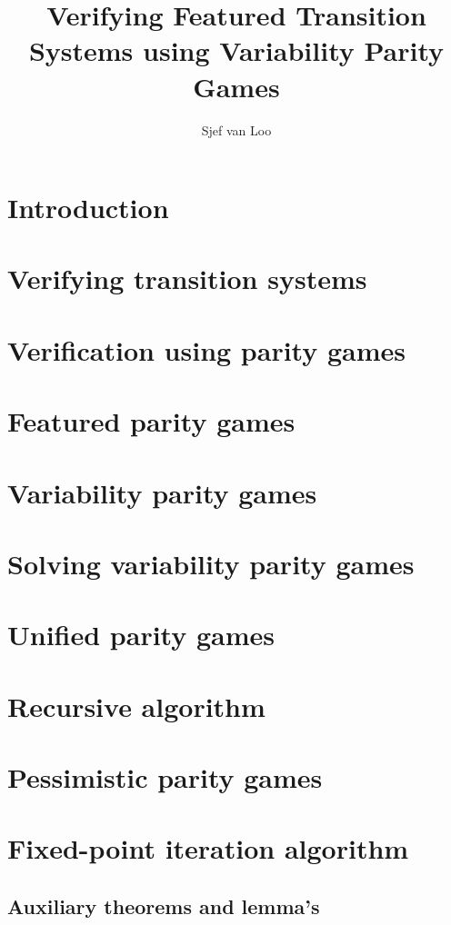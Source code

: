 \documentclass[]{article}
\title{Verifying Featured Transition Systems using Variability Parity Games}
\author{Sjef van Loo}
\begin{document}
\maketitle

\tableofcontents

\section{Introduction}


\section{Verifying transition systems}


\section{Verification using parity games}


\section{Featured parity games}


\section{Variability parity games}

\pagebreak
\section{Solving variability parity games}


\section{Unified parity games}
\label{sec_unified_pg}


\section{Recursive algorithm}


\pagebreak
\section{Pessimistic parity games}


\section{Fixed-point iteration algorithm}


\pagebreak
\begin{appendices}
\section{Auxiliary theorems and lemma's}
\label{appendix:proves}

\end{appendices}

 

\end{document}
